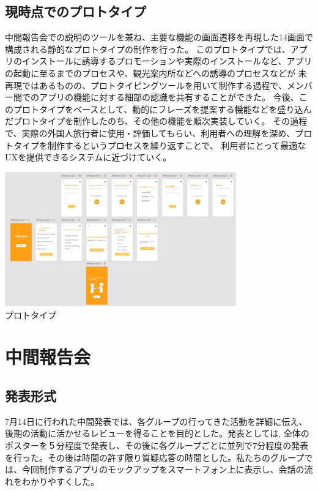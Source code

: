 \documentclass[11pt,papersize]{jsbook}
\begin{document}
\section{現時点でのプロトタイプ}\label{sec:sannosan}
 中間報告会での説明のツールを兼ね、主要な機能の画面遷移を再現した14画面で構成される静的なプロトタイプの制作を行った。
このプロトタイプでは、アプリのインストールに誘導するプロモーションや実際のインストールなど、アプリの起動に至るまでのプロセスや、観光案内所などへの誘導のプロセスなどが
未再現ではあるものの、プロトタイピングツールを用いて制作する過程で、メンバー間でのアプリの機能に対する細部の認識を共有することができた。
今後、このプロトタイプをベースとして、動的にフレーズを提案する機能などを盛り込んだプロトタイプを制作したのち、その他の機能を順次実装していく。
その過程で、実際の外国人旅行者に使用・評価してもらい、利用者への理解を深め、プロトタイプを制作するというプロセスを繰り返すことで、
利用者にとって最適なUXを提供できるシステムに近づけていく。
\begin{center}
\includegraphics[width=10cm]{cde.pdf}\\
プロトタイプ
\end{center}


\chapter{中間報告会}

\section{発表形式}
 7月14日に行われた中間発表では、各グループの行ってきた活動を詳細に伝え、後期の活動に活かせるレビューを得ることを目的とした。発表としては, 全体のポスターを５分程度で発表し、その後に各グループごとに並列で7分程度の発表を行った。その後は時間の許す限り質疑応答の時間とした。私たちのグループでは、今回制作するアプリのモックアップをスマートフォン上に表示し、会話の流れをわかりやすくした。
\end{document}
